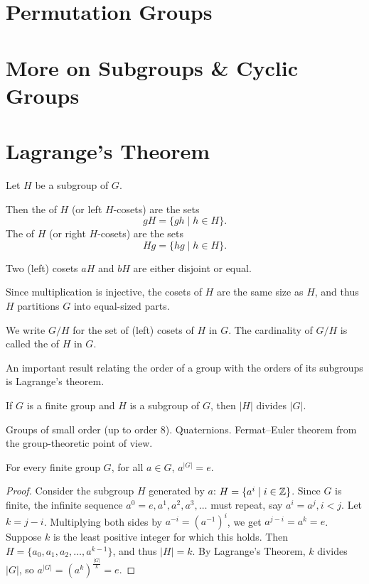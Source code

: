 \section{Permutation Groups}

\section{More on Subgroups \& Cyclic Groups}


\section{Lagrange's Theorem}
\begin{definition}[Coset]
Let $H$ be a subgroup of $G$.

Then the  of $H$ (or left $H$-cosets) are the sets
\[ gH=\{gh\mid h\in H\}. \]
The  of $H$ (or right $H$-cosets) are the sets
\[ Hg=\{hg\mid h\in H\}. \]
\end{definition}

Two (left) cosets $aH$ and $bH$ are either disjoint or equal. 

Since multiplication is injective, the cosets of $H$ are the same size as $H$, and thus $H$ partitions $G$ into equal-sized parts.

\begin{notation}
We write $G/H$ for the set of (left) cosets of $H$ in $G$. The cardinality of $G/H$ is called the  of $H$ in $G$.
\end{notation}

An important result relating the order of a group with the orders of its subgroups is Lagrange's theorem.

\begin{theorem}
If $G$ is a finite group and $H$ is a subgroup of $G$, then $|H|$ divides $|G|$.
\end{theorem}

Groups of small order (up to order 8). Quaternions. Fermat--Euler theorem
from the group-theoretic point of view.

\begin{theorem}
For every finite group $G$, for all $a \in G$, $a^{|G|}=e$.
\end{theorem}

\begin{proof}
Consider the subgroup $H$ generated by $a$: $H = \{a^i \mid i \in \mathbb Z\}$. Since $G$ is finite, the infinite sequence $a^0=e, a^1, a^2, a^3, \dots$ must repeat, say $a^i = a^j, i < j$. Let $k=j-i$. Multiplying both sides by $a^{-i} = (a^{-1})^i$, we get $a^{j-i} = a^k = e$. Suppose $k$ is the least positive integer for which this holds. Then $H = \{a_0, a_1, a_2, \dots, a^{k-1}\}$, and thus $|H| = k$. By Lagrange’s Theorem, $k$ divides $|G|$, so $a^{|G|} = (a^k)^\frac{|G|}{k} = e$.
\end{proof}

